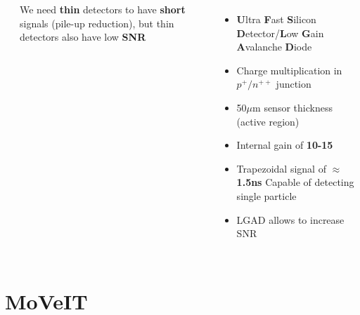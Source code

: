 \documentclass[aspectratio=169]{beamer}
\begin{document}
\begin{frame}
\begin{columns}
\begin{columns}
\begin{center}
			\end{center}
		\begin{center}
			We need \textbf{thin} detectors to have \textbf{short} signals (pile-up reduction), but thin detectors also have low \textbf{SNR}
		\end{center}
	\end{columns}
		\begin{itemize}
			\item \textbf{U}ltra \textbf{F}ast \textbf{S}ilicon \textbf{D}etector/\textbf{L}ow \textbf{G}ain \textbf{A}valanche \textbf{D}iode
			\item Charge multiplication in $p^+ / n^{++}$ junction 
			\item 50$\mu$m sensor thickness (active region)
			\item Internal gain of \textbf{10-15} 
			\item Trapezoidal signal of $\approx$\textbf{1.5ns}\newline
				{\color{blue} Capable of detecting single particle }
			\item LGAD allows to increase SNR 
		\end{itemize}
	\end{columns}
	\end{frame}

	\section{MoVeIT}
	
\end{document}
